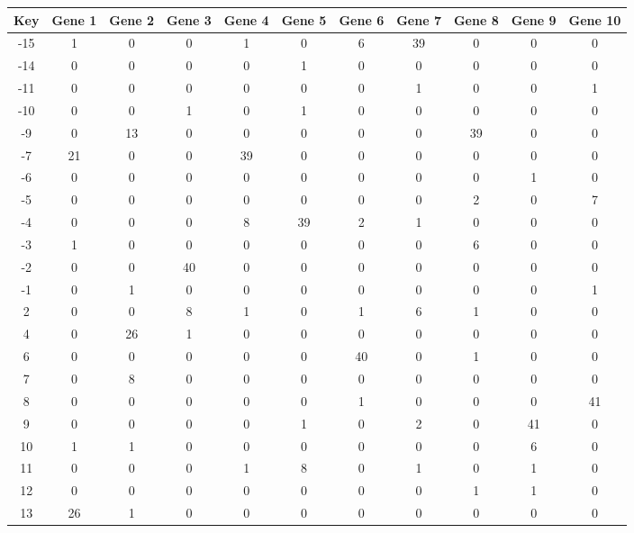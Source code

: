 \begin{tabular}{|c|c|c|c|c|c|c|c|c|c|c|}
\hline
Key & Gene 1 & Gene 2 & Gene 3 & Gene 4 & Gene 5 & Gene 6 & Gene 7 & Gene 8 & Gene 9 & Gene 10 \\
\hline
-15 & 1 & 0 & 0 & 1 & 0 & 6 & 39 & 0 & 0 & 0 \\
-14 & 0 & 0 & 0 & 0 & 1 & 0 & 0 & 0 & 0 & 0 \\
-11 & 0 & 0 & 0 & 0 & 0 & 0 & 1 & 0 & 0 & 1 \\
-10 & 0 & 0 & 1 & 0 & 1 & 0 & 0 & 0 & 0 & 0 \\
-9 & 0 & 13 & 0 & 0 & 0 & 0 & 0 & 39 & 0 & 0 \\
-7 & 21 & 0 & 0 & 39 & 0 & 0 & 0 & 0 & 0 & 0 \\
-6 & 0 & 0 & 0 & 0 & 0 & 0 & 0 & 0 & 1 & 0 \\
-5 & 0 & 0 & 0 & 0 & 0 & 0 & 0 & 2 & 0 & 7 \\
-4 & 0 & 0 & 0 & 8 & 39 & 2 & 1 & 0 & 0 & 0 \\
-3 & 1 & 0 & 0 & 0 & 0 & 0 & 0 & 6 & 0 & 0 \\
-2 & 0 & 0 & 40 & 0 & 0 & 0 & 0 & 0 & 0 & 0 \\
-1 & 0 & 1 & 0 & 0 & 0 & 0 & 0 & 0 & 0 & 1 \\
2 & 0 & 0 & 8 & 1 & 0 & 1 & 6 & 1 & 0 & 0 \\
4 & 0 & 26 & 1 & 0 & 0 & 0 & 0 & 0 & 0 & 0 \\
6 & 0 & 0 & 0 & 0 & 0 & 40 & 0 & 1 & 0 & 0 \\
7 & 0 & 8 & 0 & 0 & 0 & 0 & 0 & 0 & 0 & 0 \\
8 & 0 & 0 & 0 & 0 & 0 & 1 & 0 & 0 & 0 & 41 \\
9 & 0 & 0 & 0 & 0 & 1 & 0 & 2 & 0 & 41 & 0 \\
10 & 1 & 1 & 0 & 0 & 0 & 0 & 0 & 0 & 6 & 0 \\
11 & 0 & 0 & 0 & 1 & 8 & 0 & 1 & 0 & 1 & 0 \\
12 & 0 & 0 & 0 & 0 & 0 & 0 & 0 & 1 & 1 & 0 \\
13 & 26 & 1 & 0 & 0 & 0 & 0 & 0 & 0 & 0 & 0 \\
\hline
\end{tabular}
